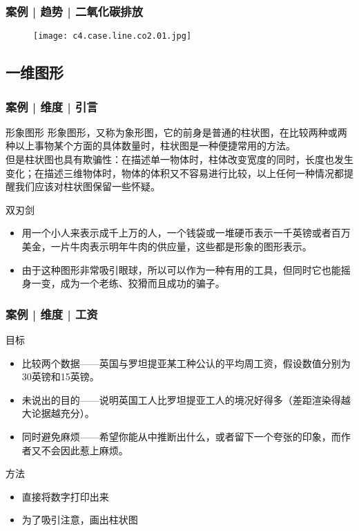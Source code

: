 \begin{frame}
  \frametitle{案例 | 趋势 | 二氧化碳排放}
    \begin{figure}
      \centering
      \texttt{[image: c4.case.line.co2.01.jpg]}
    \end{figure}
\end{frame}

\subsection{一维图形}
\begin{frame}
  \frametitle{案例 | 维度 | 引言}
  \begin{block}{形象图形}
    形象图形，又称为象形图，它的前身是普通的柱状图，在比较两种或两种以上事物某个方面的具体数量时，柱状图是一种便捷常用的方法。\\
但是\alert{柱状图也具有欺骗性}：在描述单一物体时，柱体改变宽度的同时，长度也发生变化；在描述三维物体时，物体的体积又不容易进行比较，以上任何一种情况都提醒我们应该对柱状图保留一些怀疑。\\
  \end{block}
  \pause
  \begin{block}{双刃剑}
    \begin{itemize}
      \item 用一个小人来表示成千上万的人，一个钱袋或一堆硬币表示一千英镑或者百万美金，一片牛肉表示明年牛肉的供应量，这些都是形象的图形表示。
      \item 由于这种图形非常吸引眼球，所以可以作为一种有用的工具，但同时它也能摇身一变，成为一个老练、狡猾而且成功的骗子。
    \end{itemize}
  \end{block}
\end{frame}

\begin{frame}
  \frametitle{案例 | 维度 | 工资}
  \begin{block}{目标}
    \begin{itemize}
      \item 比较两个数据——英国与罗坦提亚某工种公认的平均周工资，假设数值分别为30英镑和15英镑。
      \item 未说出的目的——说明英国工人比罗坦提亚工人的境况好得多（差距渲染得越大论据越充分）。
      \item 同时避免麻烦——希望你能从中推断出什么，或者留下一个夸张的印象，而作者又不会因此惹上麻烦。
    \end{itemize}
  \end{block}
  \pause
  \begin{block}{方法}
    \begin{itemize}
      \item 直接将数字打印出来
      \item 为了吸引注意，画出柱状图
    \end{itemize}
  \end{block}
\end{frame}

